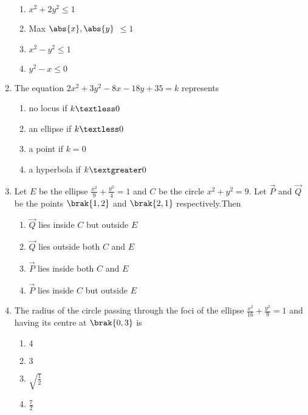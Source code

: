 \begin{enumerate}
         \hfill {}
						\begin{multicols}{2}
\begin{enumerate}
    \item $x^2+2y^2\le1$
    \item Max $\abs{x},\abs{y}$ $\le1$
    \item $x^2-y^2\le1$
    \item $y^2-x\le0$
\end{enumerate}\end{multicols}
\item The equation $2x^2+3y^2-8x-18y+35=k$ represents
        \hfill {}
							\begin{multicols}{2}
\begin{enumerate}
    \item no locus if $k\textless0$
    \item an ellipse if $k\textless0$
    \item a point if $k=0$
    \item a hyperbola if $k\textgreater0$ 
\end{enumerate}\end{multicols}
\item Let $E$ be the ellipse $\frac{x^2}{9}+\frac{y^2}{4}=1$ and $C$ be the circle $x^2+y^2=9$. Let $\vec{P}$ and $\vec{Q}$ be the points $\brak{1,2}$ and $\brak{2,1}$ respectively.Then
        \hfill {}
								\begin{multicols}{2}
\begin{enumerate}
    \item $\vec{Q}$ lies inside $C$ but outside $E$
    \item $\vec{Q}$ lies outside both $C$ and $E$
    \item $\vec{P}$ lies inside both $C$ and $E$
    \item $\vec{P}$ lies inside $C$ but outside $E$ 
\end{enumerate}\end{multicols}
\item The radius of the circle passing through the foci of the ellipse $\frac{x^2}{16}+\frac{y^2}{9}=1$ and having its centre at $\brak{0,3}$ is
       \hfill {}
									\begin{multicols}{4}
\begin{enumerate}
    \item $4$
    \item $3$
    \item $\sqrt{\frac{1}{2}}$
    \item $\frac{7}{2}$

\end{enumerate}
\end{multicols}
\end{enumerate}
